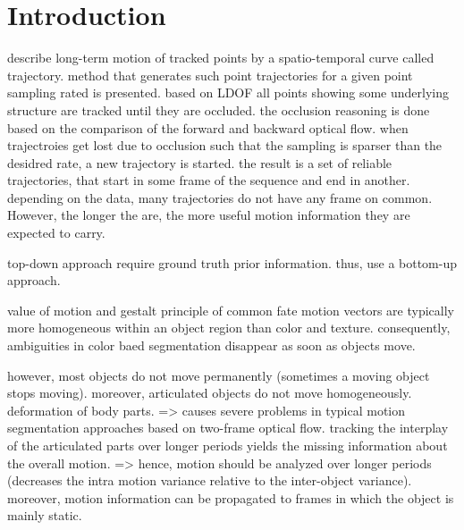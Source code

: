 
\chapter{Introduction}

describe long-term motion of tracked points by a spatio-temporal curve called trajectory.
method that generates such point trajectories for a given point sampling rated is presented. 
based on LDOF all points showing some underlying structure are tracked until they are occluded. the occlusion reasoning is done based on the comparison of the forward and backward optical flow. when trajectroies get lost due to occlusion such that the sampling is sparser than the desidred rate, a new trajectory is started. the result is a set of reliable trajectories, that start in some frame of the sequence and end in another. depending on the data, many trajectories do not have any frame on common. However, the longer the are, the more useful motion information they are expected to carry. 

top-down approach require ground truth prior information.
thus, use a bottom-up approach.

value of motion and gestalt principle of common fate
motion vectors are typically more homogeneous within an object region than color and texture. consequently, ambiguities in color baed segmentation disappear as soon as objects move.

however, most objects do not move permanently (sometimes a moving object stops moving). moreover, articulated objects do not move homogeneously. deformation of body parts.
=> causes severe problems in typical motion segmentation approaches based on two-frame optical flow.
tracking the interplay of the articulated parts over longer periods yields the missing information about the overall motion.
=> hence, motion should be analyzed over longer periods (decreases the intra motion variance relative to the inter-object variance). moreover, motion information can be propagated to frames in which the object is mainly static.

